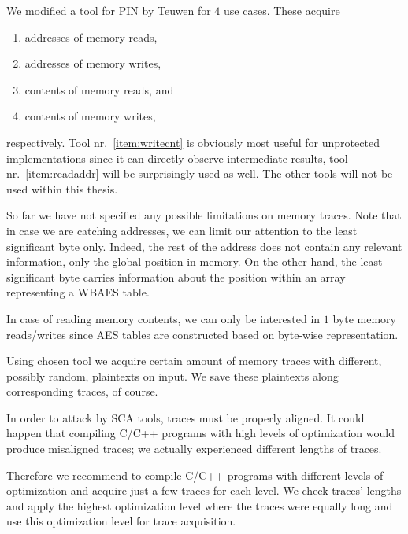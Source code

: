 We modified a tool for PIN by Teuwen \cite{teuwen2015movfuscator} for $4$ use cases. These acquire
\begin{enumerate}
	\item addresses of memory reads, \label{item:readaddr}
	\item addresses of memory writes,
	\item contents of memory reads, and
	\item contents of memory writes, \label{item:writecnt}
\end{enumerate}
respectively. Tool nr.\ \ref{item:writecnt} is obviously most useful for unprotected implementations since it can directly observe intermediate results, tool nr.\ \ref{item:readaddr} will be surprisingly used as well. The other tools will not be used within this thesis.

\begin{note}
\label{note:lsb}
	So far we have not specified any possible limitations on memory traces. Note that in case we are catching addresses, we can limit our attention to the least significant byte only. Indeed, the rest of the address does not contain any relevant information, only the global position in memory. On the other hand, the least significant byte carries information about the position within an array representing a WBAES table.
	
	In case of reading memory contents, we can only be interested in $1$ byte memory reads/writes since AES tables are constructed based on byte-wise representation.
\end{note}

Using chosen tool we acquire certain amount of memory traces with different, possibly random, plaintexts on input. We save these plaintexts along corresponding traces, of course.

\begin{note}
\label{note:optim}
	In order to attack by SCA tools, traces must be properly aligned. It could happen that compiling C/C++ programs with high levels of optimization would produce misaligned traces; we actually experienced different lengths of traces.
	
	Therefore we recommend to compile C/C++ programs with different levels of optimization and acquire just a few traces for each level. We check traces' lengths and apply the highest optimization level where the traces were equally long and use this optimization level for trace acquisition.
\end{note}

